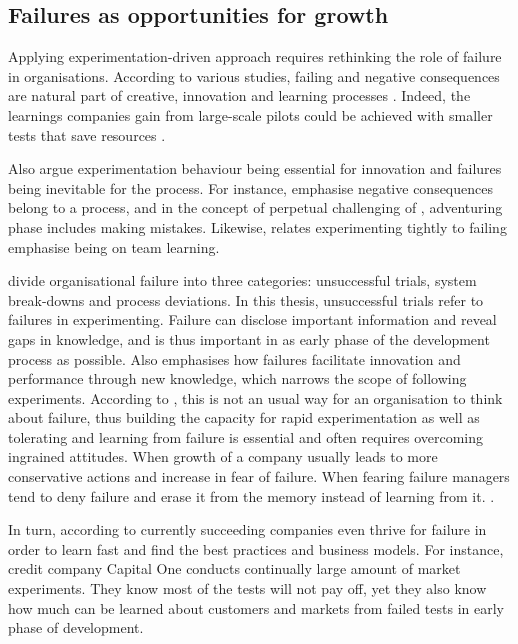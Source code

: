 \subsection{Failures as opportunities for growth}
Applying experimentation-driven approach requires rethinking the role of failure in organisations. According to various studies, failing and negative consequences are natural part of creative, innovation and learning processes \citep{hennessey19881,shalley2004leaders,andriopoulos2000enhancing}. Indeed, the learnings companies gain from large-scale pilots could be achieved with smaller tests that save resources \citep{anderson2011step}.

Also \citet{lee2004mixed} argue experimentation behaviour being essential for innovation and failures being inevitable for the process. For instance, \citet{hennessey19881} emphasise negative consequences belong to a process, and in the concept of perpetual challenging of \citet{andriopoulos2000enhancing}, adventuring phase includes making mistakes. Likewise,\citet{edmondson1999psychological} relates experimenting tightly to failing emphasise being on team learning. 

\citet{garvin2008yours} divide organisational failure into three categories: unsuccessful trials, system break-downs and process deviations. In this thesis, unsuccessful trials refer to failures in experimenting. Failure can disclose important information and reveal gaps in knowledge, and is thus important in as early phase of the development process as possible. \citep{buijs2007innovation,thomke2001enlightened} Also \citet{sitkin1992learning} emphasises how failures facilitate innovation and performance through new knowledge, which narrows the scope of following experiments. According to \citet{thomke2001enlightened}, this is not an usual way for an organisation to think about failure, thus building the capacity for rapid experimentation as well as tolerating and learning from failure is essential and often requires overcoming ingrained attitudes. When growth of a company usually leads to more conservative actions and increase in fear of failure. When fearing failure managers tend to deny failure and erase it from the memory instead of learning from it. \citep{amabile2008creativity}. 

In turn, according to \citet{farson2002failuretolerantleader} currently succeeding companies even thrive for failure in order to learn fast and find the best practices and business models. For instance, credit company Capital One conducts continually large amount of market experiments. They know most of the tests will not pay off, yet they also know how much can be learned about customers and markets from failed tests in early phase of development. \citep{farson2002failuretolerantleader}

